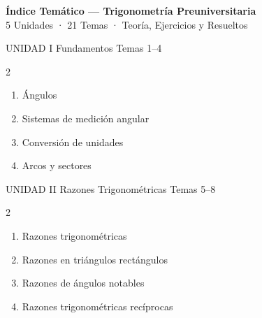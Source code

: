 
{
\hypersetup{linkcolor=AzulPizarra}
\tableofcontents
}
\newpage

\thispagestyle{fancy}

\begin{center}
  {\Large\sffamily\bfseries\color{AzulPizarra} Índice Temático — Trigonometría Preuniversitaria}\\[4pt]
  {\small\sffamily\color{GrisMedio} 5 Unidades · 21 Temas · Teoría, Ejercicios y Resueltos}
\end{center}

\vspace{0.6cm}

\begin{tcolorbox}[enhanced, colback=AzulPizarra, colframe=DoradoAcadémico,
    arc=3pt, boxrule=1pt, left=8pt, right=8pt, top=5pt, bottom=5pt,
    fontupper=\sffamily\bfseries\color{white}]
  UNIDAD I \hfill Fundamentos \hfill Temas 1–4
\end{tcolorbox}
\begin{multicols}{2}
  \begin{enumerate}[label=\textcolor{AzulPizarra}{\textbf{\arabic*.}},
      leftmargin=2em, itemsep=1pt]
    \item Ángulos
    \item Sistemas de medición angular
    \item Conversión de unidades
    \item Arcos y sectores
  \end{enumerate}
\end{multicols}

\vspace{0.4cm}

\begin{tcolorbox}[enhanced, colback=AzulMedio, colframe=DoradoAcadémico,
    arc=3pt, boxrule=1pt, left=8pt, right=8pt, top=5pt, bottom=5pt,
    fontupper=\sffamily\bfseries\color{white}]
  UNIDAD II \hfill Razones Trigonométricas \hfill Temas 5–8
\end{tcolorbox}
\begin{multicols}{2}
  \begin{enumerate}[label=\textcolor{AzulMedio}{\textbf{\arabic*.}},
      leftmargin=2em, itemsep=1pt, start=5]
    \item Razones trigonométricas
    \item Razones en triángulos rectángulos
    \item Razones de ángulos notables
    \item Razones trigonométricas recíprocas
  \end{enumerate}
\end{multicols}

